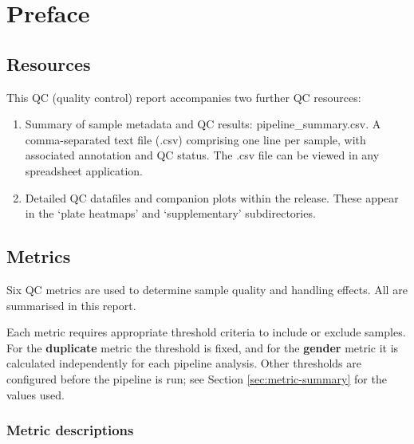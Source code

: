 

\section{Preface}

\subsection{Resources}

This QC (quality control) report accompanies two further QC resources:
\begin{enumerate}
\item Summary of sample metadata and QC results: pipeline\_summary.csv. A comma-separated text file (.csv) comprising one line per sample, with associated annotation and QC status. The .csv file can be viewed in any spreadsheet application.
\item Detailed QC datafiles and companion plots within the release.  These appear in the `plate heatmaps' and `supplementary' subdirectories.
\end{enumerate}

\subsection{Metrics}

Six QC metrics are used to determine sample quality and handling effects.  All are summarised in this report.

Each metric requires appropriate threshold criteria to include or exclude samples.  For the \textbf{duplicate} metric the threshold is fixed, and for the \textbf{gender} metric it is calculated independently for each pipeline analysis.  Other thresholds are configured before the pipeline is run; see Section \ref{sec:metric-summary} for the values used.

\subsubsection*{Metric descriptions}

